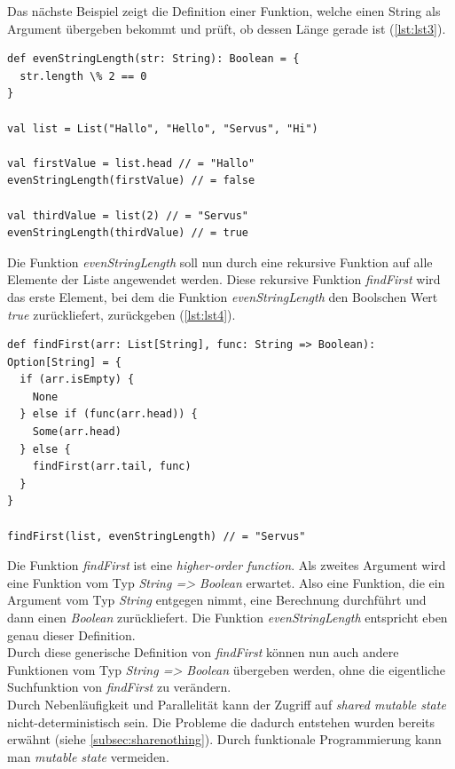 Das nächste Beispiel zeigt die Definition einer Funktion, welche einen String als Argument übergeben bekommt und prüft, ob dessen Länge gerade ist (\ref{lst:lst3}).

\begin{lstlisting}[caption={Funktion, welche prüft, ob die Länge eines Strings gerade ist.},label={lst:lst3}]
def evenStringLength(str: String): Boolean = {
  str.length \% 2 == 0
}

val list = List("Hallo", "Hello", "Servus", "Hi")

val firstValue = list.head // = "Hallo"
evenStringLength(firstValue) // = false

val thirdValue = list(2) // = "Servus"
evenStringLength(thirdValue) // = true
\end{lstlisting}

\pagebreak

Die Funktion \textit{evenStringLength} soll nun durch eine rekursive Funktion auf alle Elemente der Liste angewendet werden. Diese rekursive Funktion \textit{findFirst} wird das erste Element, bei dem die Funktion \textit{evenStringLength} den Boolschen Wert \textit{true} zurückliefert, zurückgeben (\ref{lst:lst4}).
  
\begin{lstlisting}[caption={Rekursive Funktion zur Suche des ersten passenden Elements.},label={lst:lst4}]
def findFirst(arr: List[String], func: String => Boolean): Option[String] = {
  if (arr.isEmpty) {
    None
  } else if (func(arr.head)) {
    Some(arr.head)
  } else {
    findFirst(arr.tail, func)
  }
}

findFirst(list, evenStringLength) // = "Servus"
\end{lstlisting}

Die Funktion \textit{findFirst} ist eine \textit{higher-order function}. Als zweites Argument wird eine Funktion vom Typ \textit{String => Boolean} erwartet. Also eine Funktion, die ein Argument vom Typ \textit{String} entgegen nimmt, eine Berechnung durchführt und dann einen \textit{Boolean} zurückliefert. Die Funktion \textit{evenStringLength} entspricht eben genau dieser Definition.\\
Durch diese generische Definition von \textit{findFirst} können nun auch andere Funktionen vom Typ \textit{String => Boolean} übergeben werden, ohne die eigentliche Suchfunktion von \textit{findFirst} zu verändern.\\

Durch Nebenläufigkeit und Parallelität kann der Zugriff auf \textit{shared mutable state} nicht-deterministisch sein. Die Probleme die dadurch entstehen wurden bereits erwähnt (siehe \ref{subsec:sharenothing}). Durch funktionale Programmierung kann man \textit{mutable state} vermeiden.
